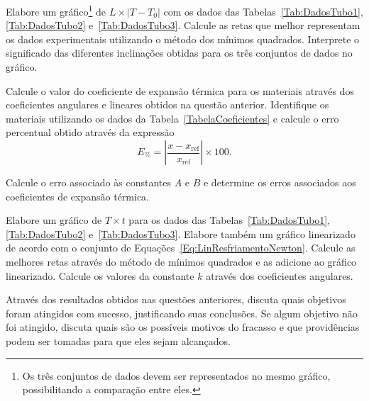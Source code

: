 \begin{question}[type={exam}]{1.5}
Elabore um gráfico\footnote{Os três conjuntos de dados devem ser representados no mesmo gráfico, possibilitando a comparação entre eles.} de $L \times |T - T_0|$ com os dados das Tabelas~\ref{Tab:DadosTubo1}, \ref{Tab:DadosTubo2} e~\ref{Tab:DadosTubo3}. Calcule as retas que melhor representam os dados experimentais utilizando o método dos mínimos quadrados. Interprete o significado das diferentes inclinações obtidas para os três conjuntos de dados no gráfico.
\end{question}
 
\begin{question}[type={exam}]{1.5}
Calcule o valor do coeficiente de expansão térmica para os materiais através dos coeficientes angulares e lineares obtidos na questão anterior. Identifique os materiais utilizando os dados da Tabela~\ref{TabelaCoeficientes} e calcule o erro percentual obtido através da expressão
\begin{equation}
	E_{\%} = \left|\frac{x-x_{\textrm{ref}}}{x_{\textrm{ref}}}\right| \times 100.
\end{equation}
\end{question}

\begin{question}[type={exam}]{1.5}
Calcule o erro associado às constantes $A$ e $B$ e determine os erros associados aos coeficientes de expansão térmica. 
\end{question}

\begin{question}[type={exam}]{1.5}
Elabore um gráfico de $T \times t$ para os dados das  Tabelas~\ref{Tab:DadosTubo1}, \ref{Tab:DadosTubo2} e~\ref{Tab:DadosTubo3}. Elabore também um gráfico linearizado de acordo com o conjunto de Equações~\eqref{Eq:LinResfriamentoNewton}. Calcule as melhores retas através do método de mínimos quadrados e as adicione ao gráfico linearizado. Calcule os valores da constante $k$ através dos coeficientes angulares.
\end{question}

\begin{question}[type={exam}]{1.5}
Através dos resultados obtidos nas questões anteriores, discuta quais objetivos foram atingidos com sucesso, justificando suas conclusões. Se algum objetivo não foi atingido, discuta quais são os possíveis motivos do fracasso e que providências podem ser tomadas para que eles sejam alcançados.
\end{question}

